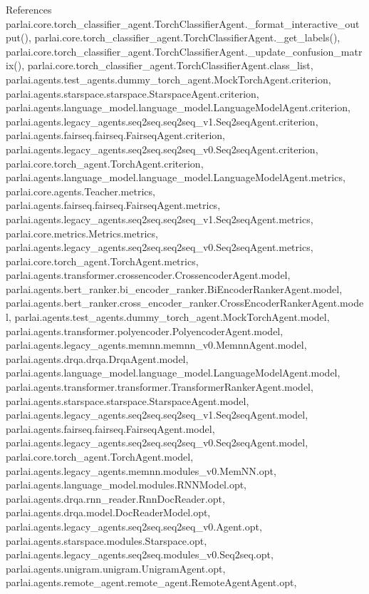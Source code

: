 References parlai.\+core.\+torch\+\_\+classifier\+\_\+agent.\+Torch\+Classifier\+Agent.\+\_\+format\+\_\+interactive\+\_\+output(), parlai.\+core.\+torch\+\_\+classifier\+\_\+agent.\+Torch\+Classifier\+Agent.\+\_\+get\+\_\+labels(), parlai.\+core.\+torch\+\_\+classifier\+\_\+agent.\+Torch\+Classifier\+Agent.\+\_\+update\+\_\+confusion\+\_\+matrix(), parlai.\+core.\+torch\+\_\+classifier\+\_\+agent.\+Torch\+Classifier\+Agent.\+class\+\_\+list, parlai.\+agents.\+test\+\_\+agents.\+dummy\+\_\+torch\+\_\+agent.\+Mock\+Torch\+Agent.\+criterion, parlai.\+agents.\+starspace.\+starspace.\+Starspace\+Agent.\+criterion, parlai.\+agents.\+language\+\_\+model.\+language\+\_\+model.\+Language\+Model\+Agent.\+criterion, parlai.\+agents.\+legacy\+\_\+agents.\+seq2seq.\+seq2seq\+\_\+v1.\+Seq2seq\+Agent.\+criterion, parlai.\+agents.\+fairseq.\+fairseq.\+Fairseq\+Agent.\+criterion, parlai.\+agents.\+legacy\+\_\+agents.\+seq2seq.\+seq2seq\+\_\+v0.\+Seq2seq\+Agent.\+criterion, parlai.\+core.\+torch\+\_\+agent.\+Torch\+Agent.\+criterion, parlai.\+agents.\+language\+\_\+model.\+language\+\_\+model.\+Language\+Model\+Agent.\+metrics, parlai.\+core.\+agents.\+Teacher.\+metrics, parlai.\+agents.\+fairseq.\+fairseq.\+Fairseq\+Agent.\+metrics, parlai.\+agents.\+legacy\+\_\+agents.\+seq2seq.\+seq2seq\+\_\+v1.\+Seq2seq\+Agent.\+metrics, parlai.\+core.\+metrics.\+Metrics.\+metrics, parlai.\+agents.\+legacy\+\_\+agents.\+seq2seq.\+seq2seq\+\_\+v0.\+Seq2seq\+Agent.\+metrics, parlai.\+core.\+torch\+\_\+agent.\+Torch\+Agent.\+metrics, parlai.\+agents.\+transformer.\+crossencoder.\+Crossencoder\+Agent.\+model, parlai.\+agents.\+bert\+\_\+ranker.\+bi\+\_\+encoder\+\_\+ranker.\+Bi\+Encoder\+Ranker\+Agent.\+model, parlai.\+agents.\+bert\+\_\+ranker.\+cross\+\_\+encoder\+\_\+ranker.\+Cross\+Encoder\+Ranker\+Agent.\+model, parlai.\+agents.\+test\+\_\+agents.\+dummy\+\_\+torch\+\_\+agent.\+Mock\+Torch\+Agent.\+model, parlai.\+agents.\+transformer.\+polyencoder.\+Polyencoder\+Agent.\+model, parlai.\+agents.\+legacy\+\_\+agents.\+memnn.\+memnn\+\_\+v0.\+Memnn\+Agent.\+model, parlai.\+agents.\+drqa.\+drqa.\+Drqa\+Agent.\+model, parlai.\+agents.\+language\+\_\+model.\+language\+\_\+model.\+Language\+Model\+Agent.\+model, parlai.\+agents.\+transformer.\+transformer.\+Transformer\+Ranker\+Agent.\+model, parlai.\+agents.\+starspace.\+starspace.\+Starspace\+Agent.\+model, parlai.\+agents.\+legacy\+\_\+agents.\+seq2seq.\+seq2seq\+\_\+v1.\+Seq2seq\+Agent.\+model, parlai.\+agents.\+fairseq.\+fairseq.\+Fairseq\+Agent.\+model, parlai.\+agents.\+legacy\+\_\+agents.\+seq2seq.\+seq2seq\+\_\+v0.\+Seq2seq\+Agent.\+model, parlai.\+core.\+torch\+\_\+agent.\+Torch\+Agent.\+model, parlai.\+agents.\+legacy\+\_\+agents.\+memnn.\+modules\+\_\+v0.\+Mem\+N\+N.\+opt, parlai.\+agents.\+language\+\_\+model.\+modules.\+R\+N\+N\+Model.\+opt, parlai.\+agents.\+drqa.\+rnn\+\_\+reader.\+Rnn\+Doc\+Reader.\+opt, parlai.\+agents.\+drqa.\+model.\+Doc\+Reader\+Model.\+opt, parlai.\+agents.\+legacy\+\_\+agents.\+seq2seq.\+seq2seq\+\_\+v0.\+Agent.\+opt, parlai.\+agents.\+starspace.\+modules.\+Starspace.\+opt, parlai.\+agents.\+legacy\+\_\+agents.\+seq2seq.\+modules\+\_\+v0.\+Seq2seq.\+opt, parlai.\+agents.\+unigram.\+unigram.\+Unigram\+Agent.\+opt, parlai.\+agents.\+remote\+\_\+agent.\+remote\+\_\+agent.\+Remote\+Agent\+Agent.\+opt, 